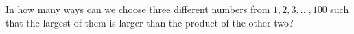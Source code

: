 In how many ways can we choose three different numbers from $1,2,3,\dots,100$ such that the largest of them is larger than the product of the other two?
